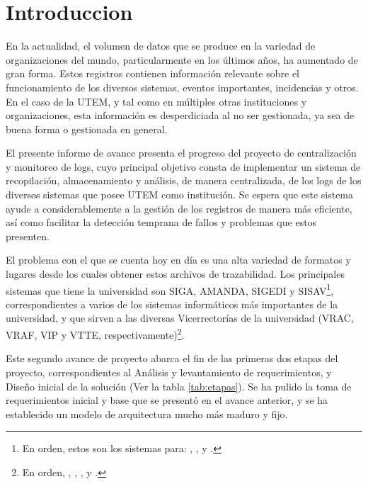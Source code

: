 \section{Introduccion}

En la actualidad, el volumen de datos que se produce en la variedad de organizaciones del mundo, particularmente en los últimos años, ha aumentado de gran forma. Estos registros contienen información relevante sobre el funcionamiento de los diversos sistemas, eventos importantes, incidencias y otros. En el caso de la UTEM, y tal como en múltiples otras instituciones y organizaciones, esta información es desperdiciada al no ser gestionada, ya sea de buena forma o gestionada en general.

El presente informe de avance presenta el progreso del proyecto de centralización y monitoreo de logs, cuyo principal objetivo consta de implementar un sistema de recopilación, almacenamiento y análisis, de manera centralizada, de los logs de los diversos sistemas que posee UTEM como institución. Se espera que este sistema ayude a considerablemente a la gestión de los registros de manera más eficiente, así como facilitar la detección temprana de fallos y problemas que estos presenten.

El problema con el que se cuenta hoy en día es una alta variedad de formatos y lugares desde los cuales obtener estos archivos de trazabilidad. Los principales sistemas que tiene la universidad son SIGA, AMANDA, SIGEDI y SISAV\footnote{En orden, estos son los sistemas para: , ,  y .}, correspondientes a varios de los sistemas informáticos más importantes de la universidad, y que sirven a las diversas Vicerrectorías de la universidad (VRAC, VRAF, VIP y VTTE, respectivamente)\footnote{En orden, , , , y .}.

Este segundo avance de proyecto abarca el fin de las primeras dos etapas del proyecto, correspondientes al Análisis y levantamiento de requerimientos, y Diseño inicial de la solución (Ver la tabla \ref{tab:etapas}). Se ha pulido la toma de requerimientos inicial y base que se presentó en el avance anterior, y se ha establecido un modelo de arquitectura mucho más maduro y fijo.

